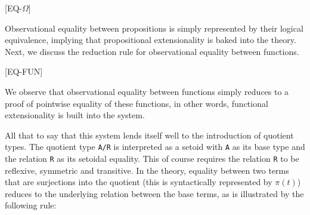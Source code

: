 \documentclass[12pt,twoside,maitrise]{dms}
\theoremstyle{definition}
\numberwithin{equation}{section}
\numberwithin{table}{chapter}
\numberwithin{figure}{chapter}
\newcommand\kw[1] {\textsf{#1}}
\newcommand\id[1] {\texttt{#1}}
\newcommand\fn[1] {\texttt{#1}}
\begin{document}
\begin{prooftree*}

  [\kw{EQ-$\Omega$}]{}
\end{prooftree*}

Observational equality between propositions is simply represented by their
logical equivalence, implying that propositional extensionality is baked into
the theory. Next, we discuss the reduction rule for observational equality
between functions.

\begin{prooftree*}

  [\kw{EQ-FUN}]{}
\end{prooftree*}

We observe that observational equality between functions simply reduces to a
proof of pointwise equality of these functions, in other words, functional
extensionality is built into the system.

All that to say that this system lends itself well to the introduction of
quotient types. The quotient type \fn{A/R} is interpreted as a setoid with
\id{A} as its base type and the relation \id{R} as its setoidal equality. This
of course requires the relation \id{R} to be reflexive, symmetric and
transitive. In the theory, equality between two terms that are surjections into
the quotient (this is syntactically represented by $\pi(t)$) reduces to the
underlying relation between the base terms, as is illustrated by the following
rule:


\begin{prooftree*}

\end{prooftree*}
\end{document}
